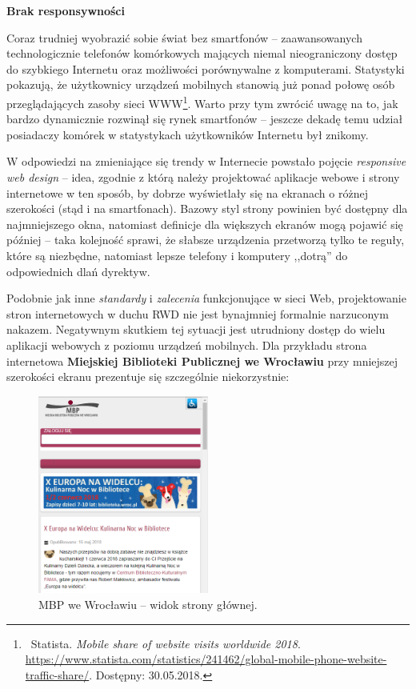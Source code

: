 \documentclass[12pt, a4paper]{article}
\begin{document}
\noindent\textbf{Brak responsywności}\\\vspace{-0.35cm}

Coraz trudniej wyobrazić sobie świat bez smartfonów -- zaawansowanych technologicznie telefonów komórkowych mających niemal nieograniczony dostęp do szybkiego Internetu oraz możliwości porównywalne z komputerami. Statystyki pokazują, że użytkownicy urządzeń mobilnych stanowią już ponad połowę osób przeglądających zasoby sieci WWW\footnote{\ Statista. \textit{Mobile share of website visits worldwide 2018}. \url{https://www.statista.com/statistics/241462/global-mobile-phone-website-traffic-share/}. Dostępny: 30.05.2018.}. Warto przy tym zwrócić uwagę na to, jak bardzo dynamicznie rozwinął się rynek smartfonów -- jeszcze dekadę temu udział posiadaczy komórek w statystykach użytkowników Internetu był znikomy.

W odpowiedzi na zmieniające się trendy w Internecie powstało pojęcie \textit{responsive web design} -- idea, zgodnie z którą należy projektować aplikacje webowe i strony internetowe w ten sposób, by dobrze wyświetlały się na ekranach o różnej szerokości (stąd i na smartfonach). Bazowy styl strony powinien być dostępny dla najmniejszego okna, natomiast definicje dla większych ekranów mogą pojawić się później -- taka kolejność sprawi, że słabsze urządzenia przetworzą tylko te reguły, które są niezbędne, natomiast lepsze telefony i komputery ,,dotrą'' do odpowiednich dlań dyrektyw.
 
Podobnie jak inne \textit{standardy} i \textit{zalecenia} funkcjonujące w sieci Web, projektowanie stron internetowych w duchu RWD nie jest bynajmniej formalnie narzuconym nakazem. Negatywnym skutkiem tej sytuacji jest utrudniony dostęp do wielu aplikacji webowych z poziomu urządzeń mobilnych. Dla przykładu strona internetowa \textbf{Miejskiej Biblioteki Publicznej we Wrocławiu} przy mniejszej szerokości ekranu prezentuje się szczególnie niekorzystnie:

\begin{figure}[h]
    \centering
    \includegraphics[width=0.5\textwidth]{mbp.png}
    \caption{MBP we Wrocławiu -- widok strony głównej.}
\end{figure}
\end{document}
